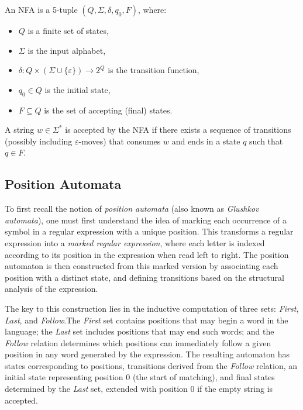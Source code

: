 An NFA is a 5-tuple $(Q, \Sigma, \delta, q_0, F)$, where:

\begin{itemize}
    \item $Q$ is a finite set of states,
    \item $\Sigma$ is the input alphabet,
    \item $\delta: Q \times (\Sigma \cup \{\varepsilon\}) \rightarrow 2^Q$ is the transition function,
    \item $q_0 \in Q$ is the initial state,
    \item $F \subseteq Q$ is the set of accepting (final) states.
\end{itemize}

A string $w \in \Sigma^*$ is accepted by the NFA if there exists a sequence of transitions (possibly including $\varepsilon$-moves) that consumes $w$ and ends in a state $q$ such that $q \in F$.

\subsection{Position Automata}

To first recall the notion of \emph{position automata} (also known as \emph{Glushkov automata}), one must first understand the idea of marking each occurrence of a symbol in a regular expression with a unique position. This transforms a regular expression into a \emph{marked regular expression}, where each letter is indexed according to its position in the expression when read left to right. The position automaton is then constructed from this marked version by associating each position with a distinct state, and defining transitions based on the structural analysis of the expression. \cite{mesh-of-automata}

The key to this construction lies in the inductive computation of three sets: \emph{First}, \emph{Last}, and \emph{Follow}.The \emph{First} set contains positions that may begin a word in the language; the \emph{Last} set includes positions that may end such words; and the \emph{Follow} relation determines which positions can immediately follow a given position in any word generated by the expression. The resulting automaton has states corresponding to positions, transitions derived from the \emph{Follow} relation, an initial state representing position 0 (the start of matching), and final states determined by the \emph{Last} set, extended with position 0 if the empty string is accepted. \cite{mesh-of-automata}


